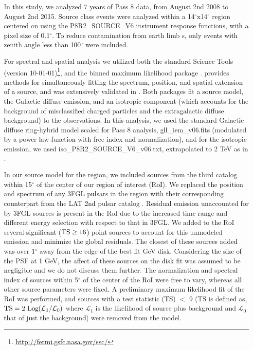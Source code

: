 In this study, we  analyzed 7 years of Pass 8 data, from August 2nd 2008  to August 2nd 2015. Source class events were analyzed within a 14$^\circ$x14$^\circ$ region centered on \Gone{} using the P8R2\_SOURCE\_V6 instrument response functions, with a pixel size of 0.1$^{\circ}$. To reduce contamination from earth limb \gam{}s, only events with zenith angle less than 100$^{\circ}$ were included.

For spectral and spatial analysis we utilized both the standard \Fermi{} Science Tools (version 10-01-01)\footnote[1]{\url{http://fermi.gsfc.nasa.gov/ssc/}}, and the binned maximum likelihood package \ptlike{} \citep{Kerr10}. \ptlike{} provides methods for simultaneously fitting the spectrum, position, and spatial extension of a source, and was extensively validated in \cite{Lande12}. Both packages fit a source model, the Galactic diffuse emission, and an isotropic component (which accounts for the background of misclassified charged particles and the extragalactic diffuse \gam{} background) to the observations. In this analysis, we used the standard Galactic diffuse ring-hybrid model scaled for Pass 8 analysis, gll{\_}iem{\_}v06.fits (modulated by a power law function with free index and normalization), and for the isotropic emission,  we used iso{\_}P8R2{\_}SOURCE{\_}V6{\_}v06.txt, extrapolated to 2 TeV as in \cite{2FHL}.

In our source model for the region, we included sources from the third \FermiLat{} catalog \citep[3FGL]{3FGL} within 15$^\circ$ of the center of our region of interest (RoI). We replaced the position and spectrum of any 3FGL pulsars in the region with their corresponding counterpart  from the LAT 2nd pulsar catalog \citep{2PC}.  Residual emission unaccounted for by 3FGL sources is present in the RoI due to the increased time range and different energy selection with respect to that in 3FGL. We added to the RoI several significant (${\rm TS \geq 16}$) point sources to account for this unmodeled emission and minimize the global residuals. The closest of these sources added was over 1$^{\circ}$ away from the edge of the best fit GeV disk. Considering the size of the PSF at 1 GeV, the affect of these sources on the disk fit was assumed to be  negligible and we do not discuss them further.  The normalization and spectral index of sources within 5$^{\circ}$ of the center of the RoI were free to vary, whereas all other source parameters were fixed. A preliminary maximum likelihood fit of the RoI was performed, and  sources with a test statistic (TS) $<$ 9 (TS is defined as,  ${\rm TS}=2~{\rm Log}(\mathcal{L}_1 / \mathcal{L}_0)$ where $\mathcal{L}_1$ 
is the likelihood of source plus background and  $\mathcal{L}_0$ that of just the background) were removed from the model. 

